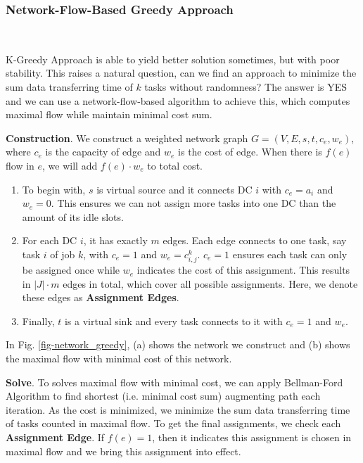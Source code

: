 \subsubsection{Network-Flow-Based Greedy Approach}\label{NFBGA}
~

K-Greedy Approach is able to yield better solution sometimes, but with poor stability. This raises a natural question, can we find an approach to minimize the sum data transferring time of $k$ tasks without randomness? The answer is YES and we can use a network-flow-based algorithm to achieve this, which computes maximal flow while maintain minimal cost sum.

\textbf{Construction}. 
    We construct a weighted network graph $G=(V,E,s,t,c_e,w_e)$, where $c_e$ is the capacity of edge and $w_e$ is the cost of edge. When there is $f(e)$ flow in $e$, we will add $f(e) \cdot w_e$ to total cost.
    
\begin{enumerate}
    \item
        To begin with, $s$ is virtual source and it connects DC $i$ with $c_e=a_i$ and $w_e=0$. This ensures we can not assign more tasks into one DC than the amount of its idle slots.
    \item
        For each DC $i$, it has exactly $m$ edges.
        Each edge connects to one task, say task $i$ of job $k$, with $c_e=1$ and $w_e=c_{i,j}^k$.
        $c_e=1$ ensures each task can only be assigned once while $w_e$ indicates the cost of this assignment.
        This results in  $\left | J \right | \cdot m $ edges in total, which cover all possible assignments.
        Here, we denote these edges as \textbf{Assignment Edges}.
        
    \item
        Finally, $t$ is a virtual sink and every task connects to it with $c_e=1$ and $w_e$.
\end{enumerate}
    In Fig. \ref{fig-network_greedy}, (a) shows the network we construct and (b) shows the maximal flow with minimal cost of this network.
  
  

\textbf{Solve}. To solves maximal flow with minimal cost, we can apply Bellman-Ford Algorithm to find shortest (i.e. minimal cost sum) augmenting path each iteration. As the cost is minimized, we minimize the sum data transferring time of tasks counted in maximal flow. To get the final assignments, we check each \textbf{Assignment Edge}. If $f(e)=1$, then it indicates this assignment is chosen in maximal flow and we bring this assignment into effect.

